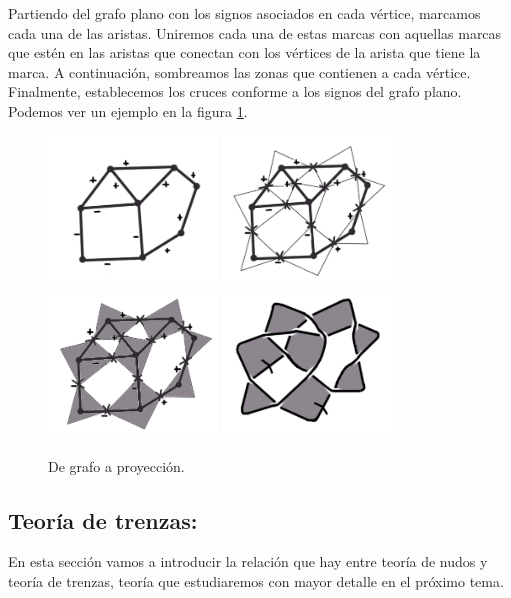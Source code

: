 Partiendo del grafo plano con los signos asociados en cada vértice, marcamos cada una de las aristas. Uniremos cada una de estas marcas con aquellas marcas que estén en las aristas que conectan con los vértices de la arista que tiene la marca. A continuación, sombreamos las zonas que contienen a cada vértice. Finalmente, establecemos los cruces conforme a los signos del grafo plano. Podemos ver un ejemplo en la figura \ref{graf3}.\\
\begin{figure}[h!]
	\centering
	\includegraphics[width=4.5cm]{inudos/grafo1.png}
	\includegraphics[width=4.5cm]{inudos/grafo2.png}
	\includegraphics[width=4.5cm]{inudos/grafo3.png}
	\includegraphics[width=4.5cm]{inudos/grafo4.png}
	\caption{De grafo a proyección.}
	\label{graf3} 
\end{figure}



\begin{center}
	\item \subsection{Teoría de trenzas:}
\end{center}
En esta sección vamos a introducir la relación que hay entre teoría de nudos y teoría de trenzas, teoría que estudiaremos con mayor detalle en el próximo tema.\\

